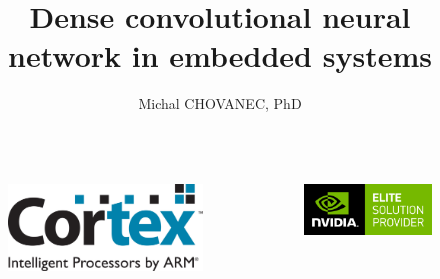 \documentclass[xcolor=dvipsnames]{beamer}
\title{\bf Dense convolutional neural network in embedded systems}
\author{Michal CHOVANEC, PhD}
\date[EURP]{}
\begin{document}
\begin{frame}
\titlepage


\begin{columns}
\begin{column}{0.5\textwidth}

  \begin{figure}
    \includegraphics[scale=0.15]{../../pictures/arm_cortex.jpg}
  \end{figure}

\end{column}
\begin{column}{0.5\textwidth}  %

  \begin{figure}
  \includegraphics[scale=0.1]{../../pictures/nvidia.png}
  \end{figure}

\end{column}
\end{columns}

\end{frame}
\end{document}
